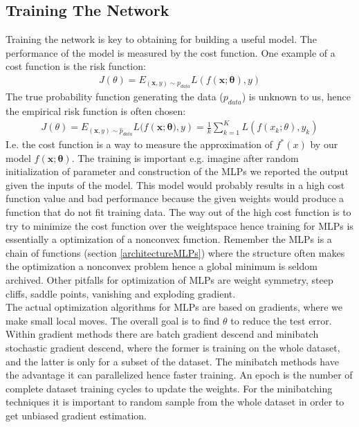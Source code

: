 \subsection{Training The Network}\label{trainNetwork}
Training the network is key to obtaining for building a useful model. The performance of the model is measured by the cost function. One example of a cost function is the risk function:
\begin{align*}
J(\theta)=E_{(\bm{x},y)\sim p_{data}} L(f(\bm{x};\bm{\theta}),y)
\end{align*}
The true probability function generating the data ($p_{data}$) is unknown to us, hence the empirical risk function is often chosen:
\begin{align*}
J(\theta)=E_{(\bm{x},y)\sim \hat{p}_{data}} L(f(\bm{x};\bm{\theta)},y)= \frac{1}{k}\sum_{k=1}^{K} L(f(x_k;\theta),y_k)
\end{align*}
I.e. the cost function is a way to measure the approximation of $f^*(x)$ by our model $f(\bm{x};\bm{\theta})$. The training is important e.g. imagine after random initialization of parameter and construction of the MLPs we reported the output given the inputs of the model. This model would probably results in a high cost function value and bad performance because the given weights would produce a function that do not fit training data. The way out of the high cost function is to try to minimize the cost function over the weightspace hence training for MLPs is essentially a optimization of a nonconvex function. Remember the MLPs is a chain of functions (section \ref{architectureMLPs}) where the structure often makes the optimization a nonconvex problem hence a global minimum is seldom archived. Other pitfalls for optimization of MLPs are weight symmetry, steep cliffs, saddle points, vanishing and exploding gradient.\\

The actual optimization algorithms for MLPs are based on gradients, where we make small local moves. The overall goal is to find $\theta$ to reduce the test error. Within gradient methods there are batch gradient descend and minibatch stochastic gradient descend, where the former is training on the whole dataset, and the latter is only for a subset of the dataset. The minibatch methods have the advantage it can parallelized hence faster training. An epoch is the number of complete dataset training cycles to update the weights. For the minibatching techniques it is important to random sample from the whole dataset in order to get unbiased gradient estimation. \\

